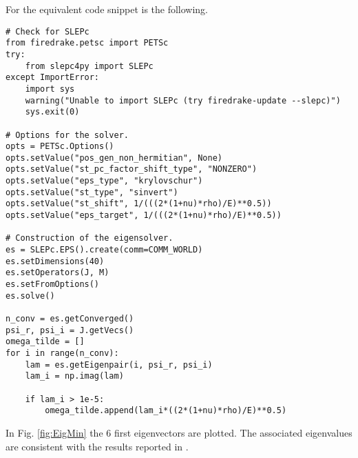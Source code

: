  For \firedrake the equivalent code snippet is the following.
\begin{tcolorbox}[title = Eigenvalues computation in  \firedrake, coltitle=black, breakable, size=fbox, boxrule=1pt, pad at break*=1mm, colframe=cyan, enlarge top by=0.25em, enlarge bottom by=0.5em]
\begin{Verbatim}[tabsize=4]
# Check for SLEPc
from firedrake.petsc import PETSc
try:
	from slepc4py import SLEPc
except ImportError:
	import sys
	warning("Unable to import SLEPc (try firedrake-update --slepc)")
	sys.exit(0)
	
# Options for the solver.
opts = PETSc.Options()
opts.setValue("pos_gen_non_hermitian", None)
opts.setValue("st_pc_factor_shift_type", "NONZERO")
opts.setValue("eps_type", "krylovschur")
opts.setValue("st_type", "sinvert")
opts.setValue("st_shift", 1/(((2*(1+nu)*rho)/E)**0.5))
opts.setValue("eps_target", 1/(((2*(1+nu)*rho)/E)**0.5))

# Construction of the eigensolver.
es = SLEPc.EPS().create(comm=COMM_WORLD)
es.setDimensions(40)
es.setOperators(J, M)
es.setFromOptions()
es.solve()

n_conv = es.getConverged()
psi_r, psi_i = J.getVecs()
omega_tilde = []
for i in range(n_conv):
	lam = es.getEigenpair(i, psi_r, psi_i)
	lam_i = np.imag(lam)
	
	if lam_i > 1e-5:
		omega_tilde.append(lam_i*((2*(1+nu)*rho)/E)**0.5)
\end{Verbatim}
\end{tcolorbox}

In Fig. \ref{fig:EigMin} the 6 first eigenvectors are plotted. The associated eigenvalues are consistent with the results reported in \cite{dawe1980rayleigh}. 

\begin{figure*}[hp]
	\centering
	\hfil
	 \\
	\hfil
	 \\
	\hfil
	\caption{Eigenvectors for the clamped Mindlin plate computed with \firedrake. The eigenfrequencies are normalized $\widehat{\omega} = \omega((2(1+\nu)\rho/E)^{1/2}$.}
	\label{fig:EigMin}
\end{figure*}



